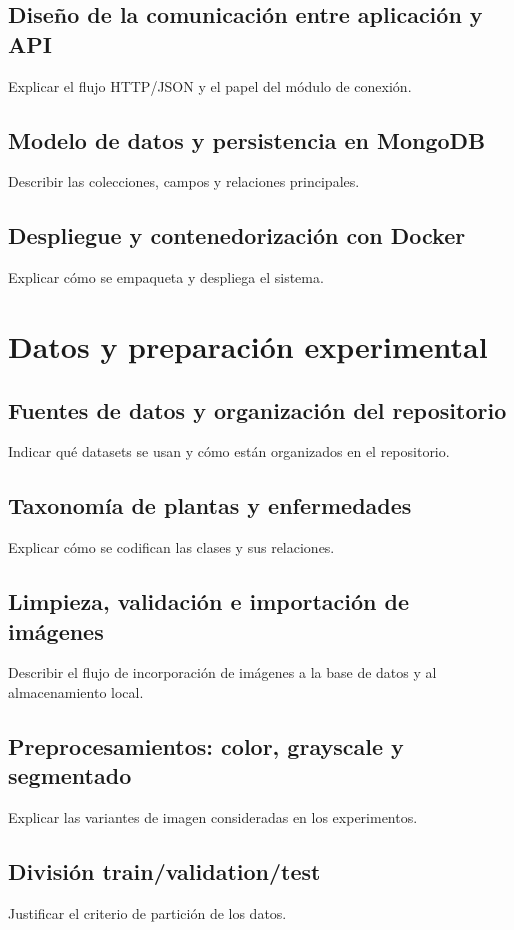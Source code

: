 \documentclass[11pt,spanish,listoffigures,listoftables]{tfgetsinf}
\begin{document}
\section{Diseño de la comunicación entre aplicación y API}
Explicar el flujo HTTP/JSON y el papel del módulo de conexión.

\section{Modelo de datos y persistencia en MongoDB}
Describir las colecciones, campos y relaciones principales.

\section{Despliegue y contenedorización con Docker}
Explicar cómo se empaqueta y despliega el sistema.

\chapter{Datos y preparación experimental}
\section{Fuentes de datos y organización del repositorio}
Indicar qué datasets se usan y cómo están organizados en el repositorio.

\section{Taxonomía de plantas y enfermedades}
Explicar cómo se codifican las clases y sus relaciones.

\section{Limpieza, validación e importación de imágenes}
Describir el flujo de incorporación de imágenes a la base de datos y al almacenamiento local.

\section{Preprocesamientos: color, grayscale y segmentado}
Explicar las variantes de imagen consideradas en los experimentos.

\section{División train/validation/test}
Justificar el criterio de partición de los datos.
\end{document}
